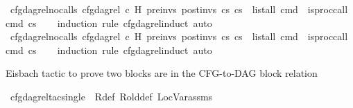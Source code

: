 \begin{isabellebody}
\isanewline
{}\isamarkupfalse%
\ cfg{\isacharunderscore}{\kern0pt}dag{\isacharunderscore}{\kern0pt}rel{\isacharunderscore}{\kern0pt}no{\isacharunderscore}{\kern0pt}calls{\isacharunderscore}{\kern0pt}{}{\isacharcolon}{\kern0pt}\ {\isachardoublequoteopen}cfg{\isacharunderscore}{\kern0pt}dag{\isacharunderscore}{\kern0pt}rel\ c\ H\ pre{\isacharunderscore}{\kern0pt}invs\ post{\isacharunderscore}{\kern0pt}invs\ cs{}\ cs{}\ {\isasymLongrightarrow}\ list{\isacharunderscore}{\kern0pt}all\ {\isacharparenleft}{\kern0pt}{\isasymlambda}cmd{\isachardot}{\kern0pt}\ {\isasymnot}\ is{\isacharunderscore}{\kern0pt}proc{\isacharunderscore}{\kern0pt}call\ cmd{\isacharparenright}{\kern0pt}\ cs{}{\isachardoublequoteclose}\isanewline
%
\isadelimproof
\ \ %
\endisadelimproof
%
\isatagproof
{}\isamarkupfalse%
\ {\isacharparenleft}{\kern0pt}induction\ rule{\isacharcolon}{\kern0pt}\ cfg{\isacharunderscore}{\kern0pt}dag{\isacharunderscore}{\kern0pt}rel{\isachardot}{\kern0pt}induct{\isacharparenright}{\kern0pt}\ auto%
\endisatagproof
{\isafoldproof}%
%
\isadelimproof
\isanewline
%
\endisadelimproof
\isanewline
{}\isamarkupfalse%
\ cfg{\isacharunderscore}{\kern0pt}dag{\isacharunderscore}{\kern0pt}rel{\isacharunderscore}{\kern0pt}no{\isacharunderscore}{\kern0pt}calls{\isacharunderscore}{\kern0pt}{}{\isacharcolon}{\kern0pt}\ {\isachardoublequoteopen}cfg{\isacharunderscore}{\kern0pt}dag{\isacharunderscore}{\kern0pt}rel\ c\ H\ pre{\isacharunderscore}{\kern0pt}invs\ post{\isacharunderscore}{\kern0pt}invs\ cs{}\ cs{}\ {\isasymLongrightarrow}\ list{\isacharunderscore}{\kern0pt}all\ {\isacharparenleft}{\kern0pt}{\isasymlambda}cmd{\isachardot}{\kern0pt}\ {\isasymnot}\ is{\isacharunderscore}{\kern0pt}proc{\isacharunderscore}{\kern0pt}call\ cmd{\isacharparenright}{\kern0pt}\ cs{}{\isachardoublequoteclose}\isanewline
%
\isadelimproof
\ \ %
\endisadelimproof
%
\isatagproof
{}\isamarkupfalse%
\ {\isacharparenleft}{\kern0pt}induction\ rule{\isacharcolon}{\kern0pt}\ cfg{\isacharunderscore}{\kern0pt}dag{\isacharunderscore}{\kern0pt}rel{\isachardot}{\kern0pt}induct{\isacharparenright}{\kern0pt}\ auto%
\endisatagproof
{\isafoldproof}%
%
\isadelimproof
%
\endisadelimproof
%
\begin{isamarkuptext}%
Eisbach tactic to prove two blocks are in the CFG-to-DAG block relation%
\end{isamarkuptext}\isamarkuptrue%
\isamarkupfalse%
\ cfg{\isacharunderscore}{\kern0pt}dag{\isacharunderscore}{\kern0pt}rel{\isacharunderscore}{\kern0pt}tac{\isacharunderscore}{\kern0pt}single\ \ R{\isacharunderscore}{\kern0pt}def\ R{\isacharunderscore}{\kern0pt}old{\isacharunderscore}{\kern0pt}def\ LocVar{\isacharunderscore}{\kern0pt}assms\ {\isacharequal}{\kern0pt}\ \isanewline

\end{isabellebody}
